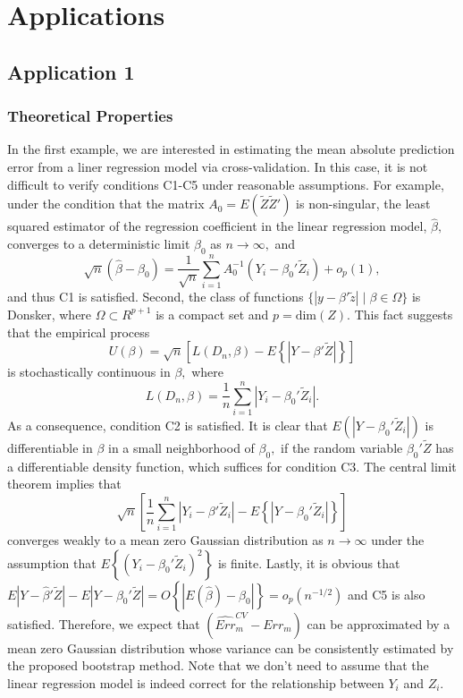 \documentclass[12pt]{article}
\begin{document}

\section{Applications}
\subsection{Application 1}
\subsubsection{Theoretical Properties}
In the first example, we are interested in estimating the mean absolute prediction error from a liner regression model via cross-validation.  In this case, it is not difficult to verify conditions C1-C5 under reasonable assumptions.  For example, under the condition that the matrix $A_0=E(\tilde{Z}\tilde{Z}')$ is non-singular, the least squared estimator of the regression coefficient in the linear regression model, $\hat{\beta},$ converges to a deterministic limit $\beta_0$ as $n \rightarrow \infty,$ and
$$\sqrt{n}(\hat{\beta}-\beta_0)=\frac{1}{\sqrt{n}}\sum_{i=1}^n A_0^{-1}\left(Y_i-\beta_0'\tilde{Z}_i\right)+o_p(1),$$
and thus C1 is satisfied. Second, the class of functions $\{|y-\beta'\tilde{z}| \mid \beta\in \Omega\}$  is Donsker, where $\Omega \subset R^{p+1}$ is a compact set and $p=\mbox{dim}(Z).$  This fact suggests that the empirical process
$$U(\beta)=\sqrt{n}\left[L\left(D_n, \beta\right)-E\left\{|Y-\beta'\tilde{Z}|\right\}\right]$$
is stochastically continuous in $\beta,$ where 
$$L\left(D_n, \beta\right)=\frac{1}{n}\sum_{i=1}^n |Y_i-\beta_0'\tilde{Z}_i|.
$$ 
As a consequence, condition C2 is satisfied.
It is clear that $E\left(|Y-\beta_0'\tilde{Z}_i|\right)$ is differentiable in $\beta$ in a small neighborhood of $\beta_0,$ if the random variable $\beta_0'\tilde{Z}$ has a differentiable density function, which suffices for condition C3.  The central limit theorem implies that
$$\sqrt{n}\left[\frac{1}{n}\sum_{i=1}^n |Y_i-\beta'\tilde{Z}_i|-E\left\{|Y-\beta_0'\tilde{Z}_i|\right\}\right]$$
converges weakly to a mean zero Gaussian distribution as $n \rightarrow \infty$ under the assumption that $E\left\{(Y_i-\beta_0'\tilde{Z}_i)^2\right\}$ is finite.  Lastly, it is obvious that $ E|Y-\hat{\beta}'\tilde{Z}|-E|Y-\beta_0'\tilde{Z}|=O\left\{|E(\hat{\beta})-\beta_0|\right\}=o_p(n^{-1/2})$ and C5 is also satisfied.  Therefore, we expect that $\left(\widehat{Err}_m^{CV}-Err_m\right)$ can be approximated by a mean zero Gaussian distribution whose variance can be consistently estimated by the proposed bootstrap method. Note that we don't need to assume that the linear regression model is indeed correct for the relationship between $Y_i$ and $Z_i.$ 
\end{document}
